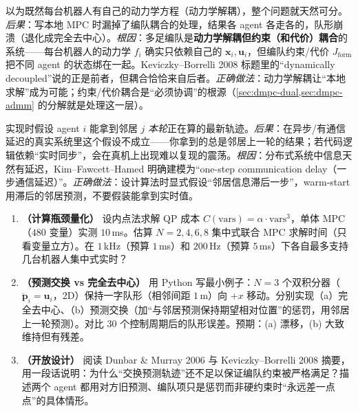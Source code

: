 \begin{pitfall}
以为既然每台机器人有自己的动力学方程（动力学解耦），整个问题就天然可分。\emph{后果}：写本地 MPC 时漏掉了编队耦合的处理，结果各 agent 各走各的，队形崩溃（退化成完全去中心）。\emph{根因}：多足编队是\textbf{动力学解耦但约束（和代价）耦合}的系统——每台机器人的动力学 $f_i$ 确实只依赖自己的 $\mathbf{x}_i,\mathbf{u}_i$，但编队约束/代价 $J_{\text{form}}$ 把不同 agent 的状态绑在一起。Keviczky--Borrelli 2008\cite{keviczky2008decentralized} 标题里的“dynamically decoupled”说的正是前者，但耦合恰恰来自后者。\emph{正确做法}：动力学解耦让“本地求解”成为可能；约束/代价耦合是“必须协调”的根源（\cref{sec:dmpc-dual,sec:dmpc-admm} 的分解就是处理这一层）。
\end{pitfall}

\begin{pitfall}
实现时假设 agent $i$ 能拿到邻居 $j$ \emph{本轮}正在算的最新轨迹。\emph{后果}：在异步/有通信延迟的真实系统里这个假设不成立——你拿到的总是邻居上一轮的结果；若代码逻辑依赖“实时同步”，会在真机上出现难以复现的震荡。\emph{根因}：分布式系统中信息天然有延迟，Kim--Fawcett--Hamed\cite{kim2023layered} 明确建模为“one-step communication delay（一步通信延迟）”。\emph{正确做法}：设计算法时显式假设“邻居信息滞后一步”，warm-start 用滞后的邻居预测，不要假装能拿到实时值。
\end{pitfall}

\begin{exercise}
\begin{enumerate}
  \item \textbf{（计算瓶颈量化）} 设内点法求解 QP 成本 $C(\text{vars})=\alpha\cdot\text{vars}^3$，单体 MPC（$480$ 变量）实测 $10$\,ms。估算 $N=2,4,6,8$ 集中式联合 MPC 求解时间（只看变量立方）。在 $1$\,kHz（预算 $1$\,ms）和 $200$\,Hz（预算 $5$\,ms）下各自最多支持几台机器人集中式实时？
  \item \textbf{（预测交换 vs 完全去中心）} 用 Python 写最小例子：$N=3$ 个双积分器（$\ddot{\mathbf{p}}_i=\mathbf{u}_i$，2D）保持一字队形（相邻间距 $1$\,m）向 $+x$ 移动。分别实现（a）完全去中心、（b）预测交换（加“与邻居预测保持期望相对位置”的惩罚，用邻居上一轮预测）。对比 $30$ 个控制周期后的队形误差。预期：(a) 漂移，(b) 大致维持但有残差。
  \item \textbf{（开放设计）} 阅读 Dunbar \& Murray 2006\cite{dunbar2006distributed} 与 Keviczky--Borrelli 2008\cite{keviczky2008decentralized} 摘要，用一段话说明：为什么“交换预测轨迹”还不足以保证编队约束被严格满足？描述两个 agent 都用对方旧预测、编队项只是惩罚而非硬约束时“永远差一点点”的具体情形。
\end{enumerate}
\end{exercise}

